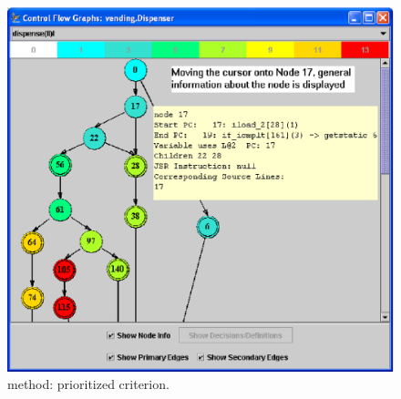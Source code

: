\begin{figure}[!ht]
\begin{center}
\includegraphics[height=0.35\textheight]{fig/dispenser-dug-edited.eps}
\caption{\label{fig:dispenser-dug} 
method: \DUG prioritized \wrt {} criterion.}
\end{center}
\end{figure}
